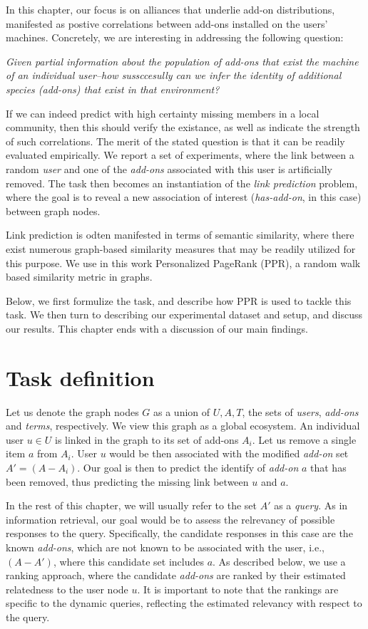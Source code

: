 \documentclass[11pt,oneside]{book}
\let\Oldsection\section
\renewcommand{\section}{\FloatBarrier\Oldsection}
\begin{document}
In this chapter, our focus is on alliances that underlie add-on
distributions, manifested as postive correlations between add-ons
installed on the users' machines. Concretely, we are interesting in
addressing the following question:

{\it Given partial information about the population of add-ons that
  exist the machine of an individual user--how sussccesully can we
  infer the identity of additional species (add-ons) that exist in
  that environment?}

If we can indeed predict with high certainty missing members in a
local community, then this should verify the existance, as well as
indicate the strength of such correlations. The merit of the stated
question is that it can be readily evaluated empirically. We report a
set of experiments, where the link between a random {\it user} and one
of the {\it add-ons} associated with this user is artificially
removed. The task then becomes an instantiation of the {\it link
  prediction} problem, where the goal is to reveal a new association
of interest ({\it has-add-on}, in this case) between graph nodes.

Link prediction is odten manifested in terms of semantic similarity,
where there exist numerous graph-based similarity measures that may be
readily utilized for this purpose. We use in this work Personalized
PageRank (PPR), a random walk based similarity metric in graphs.

Below, we first formulize the task, and describe how PPR is used to
tackle this task. We then turn to describing our experimental dataset
and setup, and discuss our results. This chapter ends with a
discussion of our main findings.


\section{Task definition}
\label{sec:task}

Let us denote the graph nodes $G$ as a union of $U,A,T$, the sets of
{\it users}, {\it add-ons} and {\it terms}, respectively. We view this
graph as a global ecosystem. An individual user $u\in U$ is linked in
the graph to its set of add-ons $A_i$. Let us remove a single item $a$
from $A_i$. User $u$ would be then associated with the modified {\it
  add-on} set $A'=(A-A_i)$. Our goal is then to predict the identify
of {\it add-on} $a$ that has been removed, thus predicting the missing
link between $u$ and $a$.

In the rest of this chapter, we will usually refer to the set $A'$ as
a {\it query}. As in information retrieval, our goal would be to
assess the relrevancy of possible responses to the
query. Specifically, the candidate responses in this case are the
known {\it add-ons}, which are not known to be associated with the
user, i.e., $(A-A')$, where this candidate set includes $a$. As
described below, we use a ranking approach, where the candidate {\it
  add-ons} are ranked by their estimated relatedness to the user node
$u$. It is important to note that the rankings are specific to the
dynamic queries, reflecting the estimated relevancy with respect to
the query.
\end{document}
